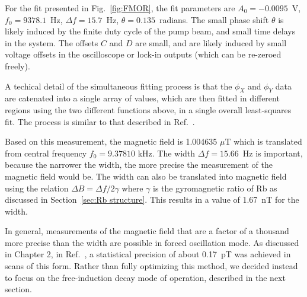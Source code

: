 For the fit presented in Fig.~\ref{fig:FMOR}, the fit parameters are
$A_0=-0.0095$~V, $f_0=9378.1$~Hz, $\Delta f=15.7$~Hz,
$\theta=0.135$~radians.  The small phase shift $\theta$ is likely
induced by the finite duty cycle of the pump beam, and small time
delays in the system.  The offsets $C$ and $D$ are small, and are
likely induced by small voltage offsets in the oscilloscope or lock-in
outputs (which can be re-zeroed freely).



A techical detail of the simultaneous fitting process is that the
$\phi_X$ and $\phi_Y$ data are catenated into a single array of
values, which are then fitted in different regions using the two
different functions above, in a single overall least-squares fit.  The
process is similar to that described in Ref.~\cite{mythesis}.

Based on this measurement, the magnetic field is 1.004635 $\mu$T which
is translated from central frequency $f_0= 9.37810$ kHz. The width
$\Delta f=15.66$~Hz is important, because the narrower the width, the
more precise the measurement of the magnetic field would be.  The
width can also be translated into magnetic field using the relation
$\Delta B= \Delta f/2 \gamma$ where $\gamma$ is the gyromagnetic ratio
of Rb as discussed in Section~\ref{sec:Rb structure}.  This results in
a value of 1.67~nT for the width.

In general, measurements of the magnetic field that are a factor of a
thousand more precise than the width are possible in forced
oscillation mode.  As discussed in Chapter 2, in Ref.~\cite{mythesis},
a statistical precision of about 0.17~pT was achieved in scans of this
form.  Rather than fully optimizing this method, we decided instead to
focus on the free-induction decay mode of operation, described in the
next section.




